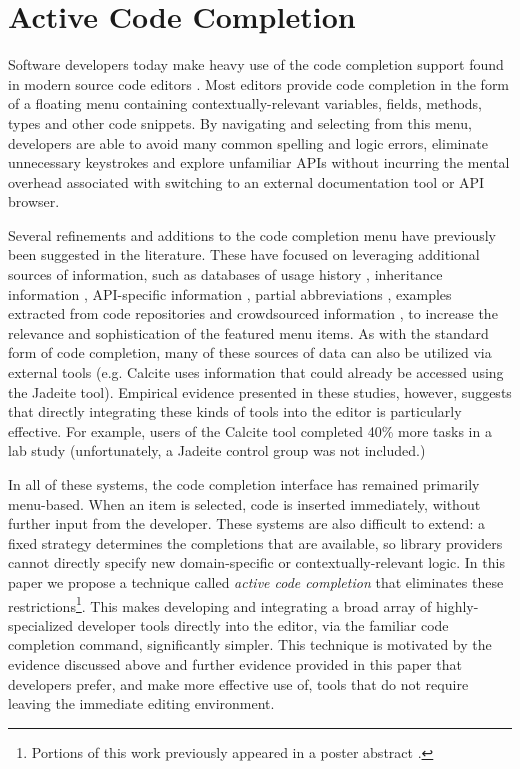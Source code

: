 \section{Active Code Completion}\label{acc}
Software developers today make heavy use of the code completion support found in modern source code editors  \cite{murphy_how_2006}. Most editors provide code completion in the form of a floating menu containing  contextually-relevant variables, fields, methods, types and other code snippets. By navigating and selecting from this menu, developers are able to avoid many common spelling and logic errors, eliminate unnecessary keystrokes and explore unfamiliar APIs without incurring the mental overhead associated with switching to an external documentation tool or API browser.

Several refinements and additions to the code completion menu have previously been suggested in the literature. These have focused on leveraging additional sources of information, such as databases of usage history \cite{robbes_how_2008}\cite{HouPletcher2011}, inheritance information \cite{HouPletcher2011}, API-specific information \cite{HouPletcher2011}\cite{Lee+2008}, partial abbreviations \cite{Han+2009}, examples extracted from code repositories \cite{bruch_learning_2009}\cite{Brandt+2010} and crowdsourced information \cite{mooty_calcite:_2010}\cite{SnipMatch}, to increase the relevance and sophistication of the featured menu items. As with the standard form of code completion, many of these sources of data can also be utilized via external tools (e.g. Calcite \cite{mooty_calcite:_2010} uses information that could already be accessed using the Jadeite \cite{conf/vl/StylosFYM09} tool). Empirical evidence presented in these studies, however, suggests that directly integrating these kinds of tools into the editor is particularly effective. For example, users of the Calcite tool completed 40\% more tasks in a lab study (unfortunately, a Jadeite control group was not included.)

In all of these systems, the code completion interface has remained primarily menu-based. When an item is selected, code is inserted immediately, without further input from the developer. These systems are also difficult to extend: a fixed strategy determines the completions that are available, so library providers cannot directly specify new domain-specific or contextually-relevant logic. 
In this paper we propose a technique called {\it active code completion} that eliminates these restrictions\footnote{Portions of this work previously appeared in a poster abstract \cite{ACC_VLHCC}.}. This  makes developing and integrating a broad array of highly-specialized developer tools directly into the editor, via the familiar code completion command, significantly simpler. This technique is motivated by the evidence discussed above and further evidence provided in this paper that developers prefer, and make more effective use of, tools that do not require leaving the immediate editing environment.

